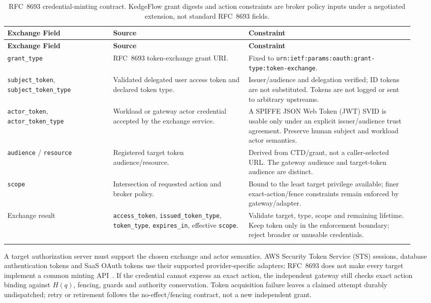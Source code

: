\small
\begin{longtable}{@{}L{0.25\linewidth}L{0.32\linewidth}L{0.39\linewidth}@{}}
\toprule
\textbf{Exchange Field} & \textbf{Source} & \textbf{Constraint}\\
\midrule
\endfirsthead
\toprule
\textbf{Exchange Field} & \textbf{Source} & \textbf{Constraint}\\
\midrule
\endhead
\texttt{grant\_type} & RFC~8693 token-exchange grant URI. & Fixed to \nolinkurl{urn:ietf:params:oauth:grant-type:token-exchange}.\\
\texttt{subject\_token}, \texttt{subject\_token\_type} & Validated delegated user access token and declared token type. & Issuer/audience and delegation verified; ID tokens are not substituted. Tokens are not logged or sent to arbitrary upstreams.\\
\texttt{actor\_token}, \texttt{actor\_token\_type} & Workload or gateway actor credential accepted by the exchange service. & A SPIFFE JSON Web Token (JWT) SVID is usable only under an explicit issuer/audience trust agreement. Preserve human subject and workload actor semantics.\\
\texttt{audience} / \texttt{resource} & Registered target token audience/resource. & Derived from CTD/grant, not a caller-selected URL. The gateway audience and target-token audience are distinct.\\
\texttt{scope} & Intersection of requested action and broker policy. & Bound to the least target privilege available; finer exact-action/fence constraints remain enforced by gateway/adapter.\\
Exchange result & \texttt{access\_token}, \texttt{issued\_token\_type}, \texttt{token\_type}, \texttt{expires\_in}, effective \texttt{scope}. & Validate target, type, scope and remaining lifetime. Keep token only in the enforcement boundary; reject broader or unusable credentials.\\
\bottomrule
\caption{RFC~8693 credential-minting contract. KedgeFlow grant digests and action constraints are broker policy inputs under a negotiated extension, not standard RFC~8693 fields.}
\label{tab:token-exchange}
\end{longtable}
\normalsize

A target authorization server must support the chosen exchange and actor semantics. AWS Security Token Service (STS) sessions, database authentication tokens and SaaS OAuth tokens use their supported provider-specific adapters; RFC~8693 does not make every target implement a common minting API~\cite{awssts2026}. If the credential cannot express an exact action, the independent gateway still checks exact action binding against $H(q)$, fencing, guards and authority conservation. Token acquisition failure leaves a claimed attempt durably undispatched; retry or retirement follows the no-effect/fencing contract, not a new independent grant.

